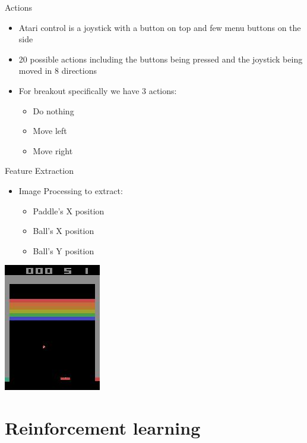 \documentclass{beamer}
\begin{document}
\begin{frame}{Actions}
  \begin{itemize}
  \item{Atari control is a joystick with a button on top and few menu buttons on the side}
  \item{20 possible actions including the buttons being pressed and the joystick being moved in 8 directions}
  \item{For breakout specifically we have 3 actions:}
    \begin{itemize}
      \item{Do nothing}
      \item{Move left}
      \item{Move right}
    \end{itemize}
  \end{itemize}
\end{frame}

\begin{frame}{Feature Extraction}
  \begin{itemize}
    \item{Image Processing to extract:}
    \begin{itemize}
      \item{Paddle's X position}
      \item{Ball's X position}
      \item{Ball's Y position}
    \end{itemize}
  \end{itemize}
  \begin{center}
  \includegraphics[scale=.75]{tmp2.jpg}
  \end{center}
\end{frame}

\section{Reinforcement learning}
\end{document}
